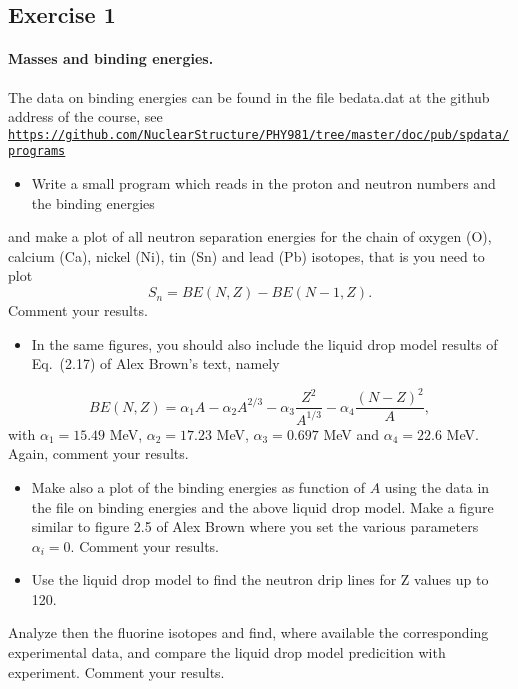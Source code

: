 \documentclass[%
twoside,                 %
final,                   %
10pt]{article}
\begin{document}
\subsection*{Exercise 1}

\paragraph{Masses and binding energies.}
The data on binding energies can be found in the file bedata.dat at the github address of the course, see
\href{{https://github.com/NuclearStructure/PHY981/tree/master/doc/pub/spdata/programs}}{\nolinkurl{https://github.com/NuclearStructure/PHY981/tree/master/doc/pub/spdata/programs}}

\begin{itemize}
  \item Write a small program which reads in the proton and neutron numbers and the binding energies 
\end{itemize}

\noindent
and make a plot of all neutron separation energies for the chain of oxygen (O), calcium (Ca), nickel (Ni), tin (Sn) and lead (Pb) isotopes, that is you need to plot
\[
S_n= BE(N,Z)-BE(N-1,Z).
\]
Comment your results. 
\begin{itemize}
 \item In the same figures, you should also include the liquid drop model results of Eq.~(2.17) of Alex Brown's text, namely
\end{itemize}

\noindent
\[
BE(N,Z)= \alpha_1A-\alpha_2A^{2/3}-\alpha_3\frac{Z^2}{A^{1/3}}-\alpha_4\frac{(N-Z)^2}{A},
\]
with $\alpha_1=15.49$ MeV, $\alpha_2=17.23$ MeV, $\alpha_3=0.697$ MeV and $\alpha_4=22.6$ MeV.
Again, comment your results. 
\begin{itemize}
 \item Make also a plot of the binding energies as function of $A$ using the data in the file on binding energies and the above liquid drop model.  Make a figure similar to figure 2.5 of Alex Brown where you set the various parameters $\alpha_i=0$. Comment your results. 

 \item Use the liquid drop model to find the neutron drip lines   for Z values up to 120.
\end{itemize}

\noindent
Analyze then the fluorine isotopes and find, where available the corresponding experimental data, and compare the liquid drop model predicition with experiment. 
Comment your results.
\end{document}
